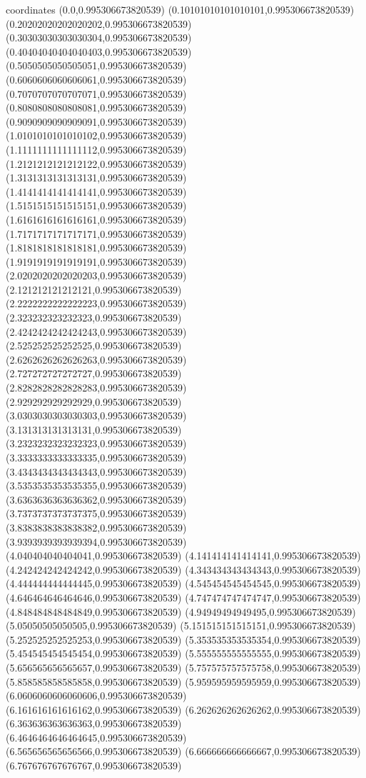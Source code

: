 coordinates {%
(0.0,0.995306673820539)
(0.10101010101010101,0.995306673820539)
(0.20202020202020202,0.995306673820539)
(0.30303030303030304,0.995306673820539)
(0.40404040404040403,0.995306673820539)
(0.5050505050505051,0.995306673820539)
(0.6060606060606061,0.995306673820539)
(0.7070707070707071,0.995306673820539)
(0.8080808080808081,0.995306673820539)
(0.9090909090909091,0.995306673820539)
(1.0101010101010102,0.995306673820539)
(1.1111111111111112,0.995306673820539)
(1.2121212121212122,0.995306673820539)
(1.3131313131313131,0.995306673820539)
(1.4141414141414141,0.995306673820539)
(1.5151515151515151,0.995306673820539)
(1.6161616161616161,0.995306673820539)
(1.7171717171717171,0.995306673820539)
(1.8181818181818181,0.995306673820539)
(1.9191919191919191,0.995306673820539)
(2.0202020202020203,0.995306673820539)
(2.121212121212121,0.995306673820539)
(2.2222222222222223,0.995306673820539)
(2.323232323232323,0.995306673820539)
(2.4242424242424243,0.995306673820539)
(2.525252525252525,0.995306673820539)
(2.6262626262626263,0.995306673820539)
(2.727272727272727,0.995306673820539)
(2.8282828282828283,0.995306673820539)
(2.929292929292929,0.995306673820539)
(3.0303030303030303,0.995306673820539)
(3.131313131313131,0.995306673820539)
(3.2323232323232323,0.995306673820539)
(3.3333333333333335,0.995306673820539)
(3.4343434343434343,0.995306673820539)
(3.5353535353535355,0.995306673820539)
(3.6363636363636362,0.995306673820539)
(3.7373737373737375,0.995306673820539)
(3.8383838383838382,0.995306673820539)
(3.9393939393939394,0.995306673820539)
(4.040404040404041,0.995306673820539)
(4.141414141414141,0.995306673820539)
(4.242424242424242,0.995306673820539)
(4.343434343434343,0.995306673820539)
(4.444444444444445,0.995306673820539)
(4.545454545454545,0.995306673820539)
(4.646464646464646,0.995306673820539)
(4.747474747474747,0.995306673820539)
(4.848484848484849,0.995306673820539)
(4.94949494949495,0.995306673820539)
(5.05050505050505,0.995306673820539)
(5.151515151515151,0.995306673820539)
(5.252525252525253,0.995306673820539)
(5.353535353535354,0.995306673820539)
(5.454545454545454,0.995306673820539)
(5.555555555555555,0.995306673820539)
(5.656565656565657,0.995306673820539)
(5.757575757575758,0.995306673820539)
(5.858585858585858,0.995306673820539)
(5.959595959595959,0.995306673820539)
(6.0606060606060606,0.995306673820539)
(6.161616161616162,0.995306673820539)
(6.262626262626262,0.995306673820539)
(6.363636363636363,0.995306673820539)
(6.4646464646464645,0.995306673820539)
(6.565656565656566,0.995306673820539)
(6.666666666666667,0.995306673820539)
(6.767676767676767,0.995306673820539)
}
